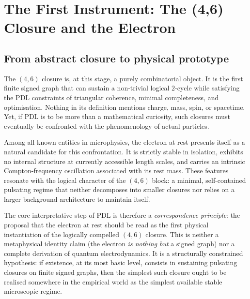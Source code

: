 \documentclass[11pt,a4paper]{article}
\theoremstyle{definition}
\begin{document}
\section{The First Instrument: The (4,6) Closure and the Electron}
\label{sec:46_electron}

\subsection{From abstract closure to physical prototype}

The \((4,6)\) closure is, at this stage, a purely combinatorial object. It is the first finite signed graph that can sustain a non-trivial logical \(2\)-cycle while satisfying the PDL constraints of triangular coherence, minimal completeness, and optimisation.\cite{Laubscher_MinimalClosures_46_2024,Laubscher_EmergencePhysicalReality_2024} Nothing in its definition mentions charge, mass, spin, or spacetime. Yet, if PDL is to be more than a mathematical curiosity, such closures must eventually be confronted with the phenomenology of actual particles.

Among all known entities in microphysics, the electron at rest presents itself as a natural candidate for this confrontation. It is strictly stable in isolation, exhibits no internal structure at currently accessible length scales, and carries an intrinsic Compton-frequency oscillation associated with its rest mass.\cite{Laubscher_EmergencePhysicalReality_2024,Laubscher_Existence_PulsatingClosure_2026} These features resonate with the logical character of the \((4,6)\) block: a minimal, self-contained pulsating regime that neither decomposes into smaller closures nor relies on a larger background architecture to maintain itself.

The core interpretative step of PDL is therefore a \emph{correspondence principle}: the proposal that the electron at rest should be read as the first physical instantiation of the logically compelled \((4,6)\) closure.\cite{Laubscher_EmergencePhysicalReality_2024,Laubscher_PDL_Position_2024} This is neither a metaphysical identity claim (the electron \emph{is nothing but} a signed graph) nor a complete derivation of quantum electrodynamics. It is a structurally constrained hypothesis: if existence, at its most basic level, consists in sustaining pulsating closures on finite signed graphs, then the simplest such closure ought to be realised somewhere in the empirical world as the simplest available stable microscopic regime.
\end{document}
